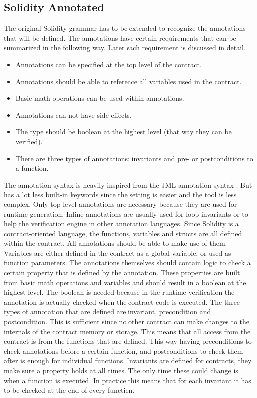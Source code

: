 \documentclass[a4paper]{article}
\begin{document}
\subsection{Solidity Annotated}
The original Solidity grammar has to be extended to recognize the annotations that will be defined. The annotations have certain requirements that can be summarized in the following way. Later each requirement is discussed in detail.
\begin{itemize}
    \item Annotations can be specified at the top level of the contract.
    \item Annotations should be able to reference all variables used in the contract.
    \item Basic math operations can be used within annotations.
    \item Annotations can not have side effects.
    \item The type should be boolean at the highest level (that way they can be verified).
    \item There are three types of annotations: invariants and pre- or postconditions to a function.
\end{itemize}

The annotation syntax is heavily inspired from the JML annotation syntax \cite{leavens2008jml}. But has a lot less built-in keywords since the setting is easier and the tool is less complex. 
Only top-level annotations are necessary because they are used for runtime generation. Inline annotations are usually used for loop-invariants or to help the verification engine in other annotation languages. Since Solidity is a contract-oriented language, the functions, variables and structs are all defined within the contract. All annotations should be able to make use of them. Variables are either defined in the contract as a global variable, or used as function parameters. The annotations themselves should contain logic to check a certain property that is defined by the annotation. These properties are built from basic math operations and variables and should result in a boolean at the highest level. The boolean is needed because in the runtime verification the annotation is actually checked when the contract code is executed. The three types of annotation that are defined are invariant, precondition and postcondition. This is sufficient since no other contract can make changes to the internals of the contract memory or storage. This means that all access from the contract is from the functions that are defined. This way having preconditions to check annotations before a certain function, and postconditions to check them after is enough for individual functions. Invariants are defined for contracts, they make sure a property holds at all times. The only time these could change is when a function is executed. In practice this means that for each invariant it has to be checked at the end of every function.
\end{document}
